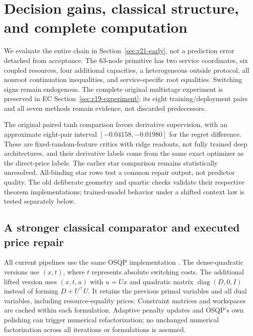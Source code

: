\section{Decision gains, classical structure, and complete computation}\label{sec:r21-empirical}
We evaluate the entire chain in Section~\ref{sec:r21-early}, not a prediction error detached from acceptance. The 63-node primitive has two service coordinates, six coupled resources, four additional capacities, a heterogeneous outside protocol, all nonroot continuation inequalities, and service-specific root equalities. Switching signs remain endogenous. The complete original multistage experiment is preserved in EC Section~\ref{sec:r19-experiment}; its eight training/deployment pairs and all seven methods remain evidence, not discarded predecessors.

The original paired tanh comparison favors derivative supervision, with an approximate eight-pair interval $[-0.04158,-0.01980]$ for the regret difference. These are fixed-random-feature critics with ridge readouts, not fully trained deep architectures, and their derivative labels come from the same exact optimizer as the direct-price labels. The earlier star comparison remains statistically unresolved. All-binding star rows test a common repair output, not predictor quality. The old deliberate geometry and quartic checks validate their respective theorem implementations; trained-model behavior under a shifted context law is tested separately below.

\subsection{A stronger classical comparator and executed price repair}
All current pipelines use the same OSQP implementation \citep{Stellato2020}. The dense-quadratic versions use $(x,t)$, where $t$ represents absolute switching costs. The additional lifted version uses $(x,t,u)$ with $u=Ux$ and quadratic matrix $\operatorname{diag}(D,0,I)$ instead of forming $D+U^\top U$. It retains the previous primal variables and all dual variables, including resource-equality prices. Constraint matrices and workspaces are cached within each formulation. Adaptive penalty updates and OSQP's own polishing can trigger numerical refactorization; no unchanged numerical factorization across all iterations or formulations is assumed.

